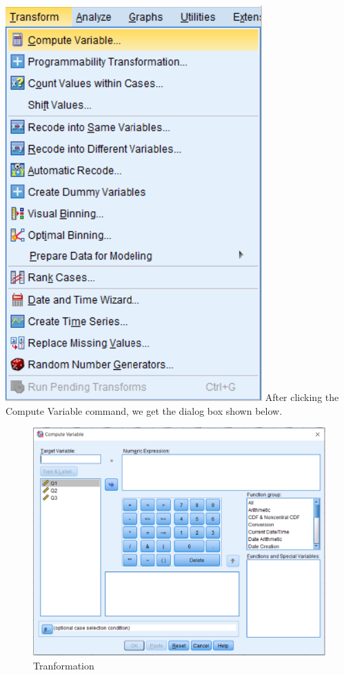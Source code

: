 \documentclass[
]{book}
\begin{document}
\includegraphics{Transform1.png}
After clicking the Compute Variable command, we get the dialog box shown below.

\begin{figure}
\centering
\includegraphics{Transform2.png}
\caption{Tranformation}
\end{figure}
\end{document}
